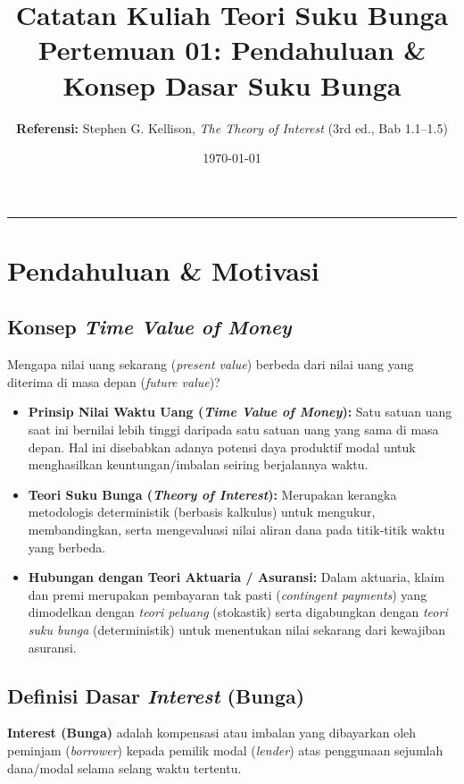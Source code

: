 \documentclass[11pt,a4paper]{article}
\title{\textbf{\LARGE Catatan Kuliah Teori Suku Bunga}\\[0.3em]
\Large Pertemuan 01: Pendahuluan \& Konsep Dasar Suku Bunga}
\author{\textbf{Referensi:} Stephen G. Kellison, \textit{The Theory of Interest} (3rd ed., Bab 1.1--1.5)}
\date{\today}
\begin{document}
\maketitle
\tableofcontents
\vspace{1em}
\hrule
\vspace{1.5em}

\section{Pendahuluan \& Motivasi}

\subsection{Konsep \textit{Time Value of Money}}
Mengapa nilai uang sekarang (\textit{present value}) berbeda dari nilai uang yang diterima di masa depan (\textit{future value})?
\begin{itemize}[leftmargin=1.5em]
    \item \textbf{Prinsip Nilai Waktu Uang (\textit{Time Value of Money}):} Satu satuan uang saat ini bernilai lebih tinggi daripada satu satuan uang yang sama di masa depan. Hal ini disebabkan adanya potensi daya produktif modal untuk menghasilkan keuntungan/imbalan seiring berjalannya waktu.
    \item \textbf{Teori Suku Bunga (\textit{Theory of Interest}):} Merupakan kerangka metodologis deterministik (berbasis kalkulus) untuk mengukur, membandingkan, serta mengevaluasi nilai aliran dana pada titik-titik waktu yang berbeda.
    \item \textbf{Hubungan dengan Teori Aktuaria / Asuransi:} Dalam aktuaria, klaim dan premi merupakan pembayaran tak pasti (\textit{contingent payments}) yang dimodelkan dengan \textit{teori peluang} (stokastik) serta digabungkan dengan \textit{teori suku bunga} (deterministik) untuk menentukan nilai sekarang dari kewajiban asuransi.
\end{itemize}

\subsection{Definisi Dasar \textit{Interest} (Bunga)}
\begin{definitionbox}
\textbf{Interest (Bunga)} adalah kompensasi atau imbalan yang dibayarkan oleh peminjam (\textit{borrower}) kepada pemilik modal (\textit{lender}) atas penggunaan sejumlah dana/modal selama selang waktu tertentu.
\end{definitionbox}
\end{document}
